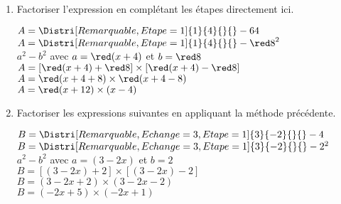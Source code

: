 \begin{corrige}
    \begin{enumerate}
        \item Factoriser l'expression en complétant les étapes directement ici.
        \begin{itemize}
            \def\item{}
            \begin{spacing}{1.2}
                \item $A = \Distri[Remarquable,Etape=1]{1}{4}{}{}-64$\\
                $A = \Distri[Remarquable,Etape=1]{1}{4}{}{}-{\red 8}^2$\\
                $a^2-b^2$ avec $a={\red (x+4)}$ et $b={\red 8}$\\
                $A = [{\red (x+4)}+{\red 8}]\times [{\red (x+4)}-{\red 8}]$\\
                $A = {\red (x+4+8)}\times {\red (x+4-8)}$\\
                $A = {\red (x+12)\times (x-4)}$\\
            \end{spacing}
        \end{itemize}
        \item Factoriser les expressions suivantes en appliquant la méthode précédente.
        \begin{itemize}
            \def\item{}
            \begin{spacing}{1.2}
                \item $B= \Distri[Remarquable,Echange=3,Etape=1]{3}{-2}{}{}-4$\\
                {\red 
                $B = \Distri[Remarquable,Echange=3,Etape=1]{3}{-2}{}{}-2^2$\\
                $a^2-b^2$ avec $a=(3-2x)$ et $b=2$\\
                $B = [(3-2x)+2]\times [(3-2x)-2]$\\
                $B = (3-2x+2)\times (3-2x-2)$\\
                $B = (-2x+5)\times (-2x+1)$\\
                }
            \end{spacing}
        \end{itemize}
    \end{enumerate}
    \Coupe
    \begin{enumerate}

\end{enumerate}
\end{corrige}
